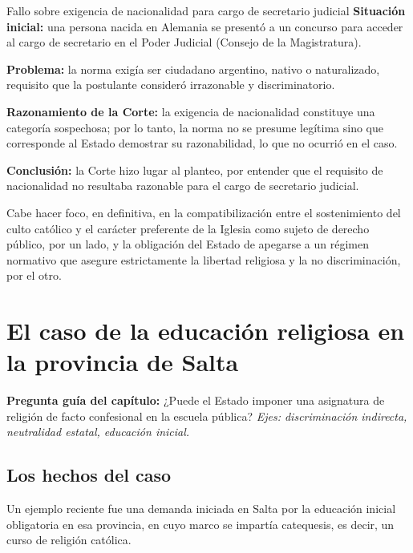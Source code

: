 \documentclass[12pt,oneside]{book}
\begin{document}
\begin{example}{Fallo sobre exigencia de nacionalidad para cargo de secretario judicial}
\textbf{Situación inicial:} una persona nacida en Alemania se presentó a un concurso para acceder al cargo de secretario en el Poder Judicial (Consejo de la Magistratura).

\textbf{Problema:} la norma exigía ser ciudadano argentino, nativo o naturalizado, requisito que la postulante consideró irrazonable y discriminatorio.

\textbf{Razonamiento de la Corte:} la exigencia de nacionalidad constituye una categoría sospechosa; por lo tanto, la norma no se presume legítima sino que corresponde al Estado demostrar su razonabilidad, lo que no ocurrió en el caso.

\textbf{Conclusión:} la Corte hizo lugar al planteo, por entender que el requisito de nacionalidad no resultaba razonable para el cargo de secretario judicial.
\end{example}

Cabe hacer foco, en definitiva, en la compatibilización entre el sostenimiento del culto católico y el carácter preferente de la Iglesia como sujeto de derecho público, por un lado, y la obligación del Estado de apegarse a un régimen normativo que asegure estrictamente la libertad religiosa y la no discriminación, por el otro.

\chapter[Educación religiosa en Salta]{El caso de la educación religiosa en la provincia de Salta}

\begin{note}
\textbf{Pregunta guía del capítulo:} ¿Puede el Estado imponer una asignatura de religión de facto confesional en la escuela pública? \textit{Ejes: discriminación indirecta, neutralidad estatal, educación inicial.}
\end{note}

\section{Los hechos del caso}

Un ejemplo reciente fue una demanda iniciada en Salta por la educación inicial obligatoria en esa provincia, en cuyo marco se impartía catequesis, es decir, un curso de religión católica.
\end{document}
